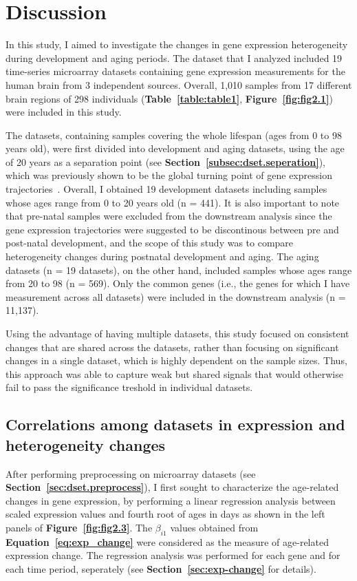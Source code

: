 \chapter{Discussion}
\label{chp:b4}

In this study, I aimed to investigate the changes in gene expression heterogeneity during development and aging periods.
The dataset that I analyzed included 19 time-series microarray datasets containing gene expression measurements for the human brain from 3 independent sources.
Overall, 1,010 samples from 17 different brain regions of 298 individuals (\textbf{Table~\ref{table:table1}}, \textbf{Figure~\ref{fig:fig2.1}}) were included in this study.

The datasets, containing samples covering the whole lifespan (ages from 0 to 98 years old), 
were first divided into development and aging datasets,
using the age of 20 years as a separation point (see \textbf{Section~\ref{subsec:dset.seperation}}), 
which was previously shown to be the global turning point of gene expression trajectories~\autocite{Donertas2017, Colantuoni2011, Somel2010}.
Overall, I obtained 19 development datasets including samples whose ages range from 0 to 20 years old (n = 441).
It is also important to note that pre-natal samples were excluded from the downstream analysis
since the gene expression trajectories were suggested to be discontinous between pre and post-natal development, 
and the scope of this study was to compare heterogeneity changes during postnatal development and aging.
The aging datasets (n = 19 datasets), on the other hand, included samples whose ages range from 20 to 98 (n = 569).
Only the common genes (i.e., the genes for which I have measurement across all datasets) were included in the downstream analysis (n = 11,137).

Using the advantage of having multiple datasets, this study focused on consistent changes that are shared across the datasets, 
rather than focusing on significant changes in a single dataset, which is highly dependent on the sample sizes. 
Thus, this approach was able to capture weak but shared signals that would otherwise fail to pass the significance treshold in individual datasets.

\section{Correlations among datasets in expression and heterogeneity changes}
After performing preprocessing on microarray datasets (see \textbf{Section~\ref{sec:dset.preprocess}}), 
I first sought to characterize the age-related changes in gene expression, 
by performing a linear regression analysis between scaled expression values and 
fourth root of ages in days as shown in the left panels of \textbf{Figure~\ref{fig:fig2.3}}.
The $\beta_{i1}$ values obtained from \textbf{Equation~\ref{eq:exp_change}} were considered as the measure of age-related expression change.
The regression analysis was performed for each gene and for each time period, seperately (see \textbf{Section~\ref{sec:exp-change}} for details).

